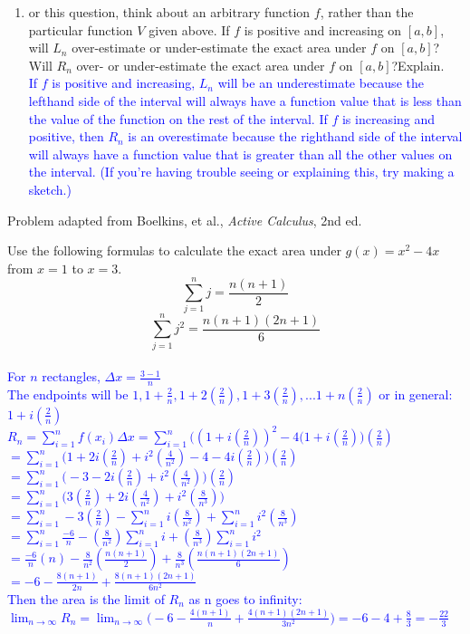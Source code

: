 \documentclass{ximera}
\begin{document}
\begin{exercise}
\begin{enumerate}
    \item or this question, think about an arbitrary function $f$, rather than the particular function $V$ given above. If $f$ is positive and increasing on $[a,b]$, will $L_n$ over-estimate or under-estimate the exact area under $f$ on $[a,b]$?  Will  $R_n$ over- or under-estimate the exact area under $f$ on $[a,b]$?Explain.\\
    \textcolor{blue}{If $f$ is positive and increasing, $L_n$ will be an underestimate because the lefthand side of the interval will always have a function value that is less than the value of the function on the rest of the interval.  If $f$ is increasing and positive, then $R_n$ is an overestimate because the righthand side of the interval will always have a function value that is greater than all the other values on the interval.  (If you're having trouble seeing or explaining this, try making a sketch.) }
 \end{enumerate}
Problem adapted from Boelkins, et al., \textit{Active Calculus}, 2nd ed. 

\end{exercise}

\begin{exercise}
    Use the following formulas to calculate the exact area under $g(x)=x^2-4x$ from $x=1$ to $x=3$.  $$\sum_{j=1}^{n} j=\frac{n(n+1)}{2}$$
    $$\sum_{j=1}^n j^2=\frac{n(n+1)(2n+1)}{6}$$\\
    \textcolor{blue}{For $n$ rectangles, $\Delta x=\frac{3-1}{n}$\\
    The endpoints will be $1, 1+\frac{2}{n}, 1+2(\frac{2}{n}), 1+3(\frac{2}{n}), ... 1+n(\frac{2}{n})$ or in general: $1+i(\frac{2}{n})$\\
    $\displaystyle R_n=\sum_{i=1}^n f(x_i)\Delta x=\sum_{i=1}^n \bigg((1+i(\frac{2}{n}))^2-4(1+i(\frac{2}{n})\bigg)(\frac{2}{n})$ \\
    $\displaystyle =\sum_{i=1}^n \bigg(1+2i(\frac{2}{n})+i^2(\frac{4}{n^2})-4-4i(\frac{2}{n})\bigg)(\frac{2}{n})$\\
    $\displaystyle =\sum_{i=1}^n \bigg(-3-2i(\frac{2}{n})+i^2(\frac{4}{n^2})\bigg)(\frac{2}{n})$\\
    $\displaystyle =\sum_{i=1}^n \bigg(3(\frac{2}{n})+2i(\frac{4}{n^2})+i^2(\frac{8}{n^3})\bigg)$\\
    $\displaystyle=\sum_{i=1}^n -3(\frac{2}{n})-\sum_{i=1}^n i(\frac{8}{n^2})+\sum_{i=1}^n i^2(\frac{8}{n^3}) $\\
    $\displaystyle=\sum_{i=1}^n \frac{-6}{n}-(\frac{8}{n^2})\sum_{i=1}^n i+(\frac{8}{n^3})\sum_{i=1}^n i^2 $\\
    $\displaystyle =\frac{-6}{n}(n)-\frac{8}{n^2}(\frac{n(n+1)}{2})+\frac{8}{n^3}(\frac{n(n+1)(2n+1)}{6})$\\
    $\displaystyle =-6-\frac{8(n+1)}{2n}+\frac{8(n+1)(2n+1)}{6n^2}$\\
    Then the area is the limit of $R_n$ as n goes to infinity:\\
    $\displaystyle\lim_{n\rightarrow \infty} R_n=\lim_{n\rightarrow \infty} \bigg( -6-\frac{4(n+1)}{n}+\frac{4(n+1)(2n+1)}{3n^2}\bigg)=-6-4+\frac{8}{3}=-\frac{22}{3}$\\}
\end{exercise}   
\end{document}
